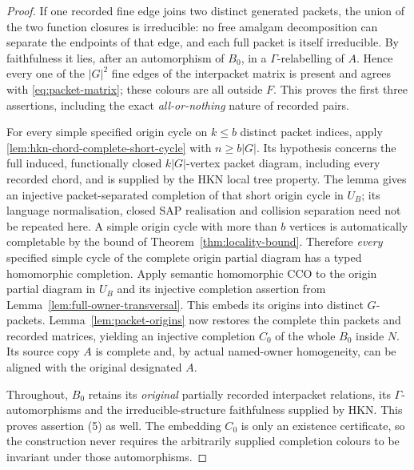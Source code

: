 \begin{proof}
If one recorded fine edge joins two distinct generated packets,
the union of the two function closures is irreducible: no free
amalgam decomposition can separate the endpoints of that edge,
and each full packet is itself irreducible.  By faithfulness it
lies, after an automorphism of $B_0$, in a $\Gamma$-relabelling
of $A$.  Hence every one of the $|G|^2$ fine edges of the
interpacket matrix is present and agrees with
\eqref{eq:packet-matrix}; these colours are all outside $F$.
This proves the first three assertions, including the exact
\emph{all-or-nothing} nature of recorded pairs.

For every simple specified origin cycle on $k\le b$ distinct
packet indices, apply \cref{lem:hkn-chord-complete-short-cycle}
with $n\ge b|G|$. Its hypothesis concerns the full induced,
functionally closed $k|G|$-vertex packet diagram, including every
recorded chord, and is supplied by the HKN local tree property.
The lemma gives an injective packet-separated completion of that
short origin cycle in $U_B$; its language normalisation, closed
SAP realisation and collision separation need not be repeated here.
A simple origin cycle with more than $b$
vertices is automatically completable by the bound of
Theorem~\ref{thm:locality-bound}.  Therefore \emph{every}
specified simple cycle of the complete origin partial diagram
has a typed homomorphic completion.  Apply semantic homomorphic
CCO to the origin partial diagram in $U_B$ and its injective
completion assertion from Lemma~\ref{lem:full-owner-transversal}.
This embeds its origins into distinct $G$-packets.
Lemma~\ref{lem:packet-origins} now restores the complete thin
packets and recorded matrices, yielding an injective completion
$C_0$ of the whole $B_0$ inside $N$.  Its source copy $A$ is
complete and, by actual named-owner homogeneity, can be aligned
with the original designated $A$.

Throughout, $B_0$ retains its \emph{original} partially recorded
interpacket relations, its $\Gamma$-automorphisms and the
irreducible-structure faithfulness supplied by HKN. This proves
assertion (5) as well.  The
embedding $C_0$ is only an existence certificate, so the
construction never requires the arbitrarily supplied completion
colours to be invariant under those automorphisms.
\end{proof}
